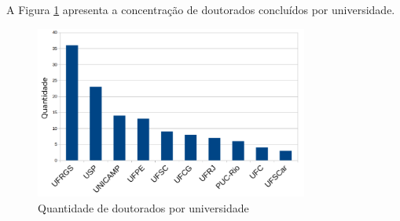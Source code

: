 A Figura \ref{fig:phd} apresenta a concentração de doutorados concluídos por universidade.

\begin{figure}[!ht]
	\centering
	\includegraphics[width=0.8\textwidth]{./imagens/phds.png}
	\caption{Quantidade de doutorados por universidade}
	\label{fig:phd}
\end{figure}